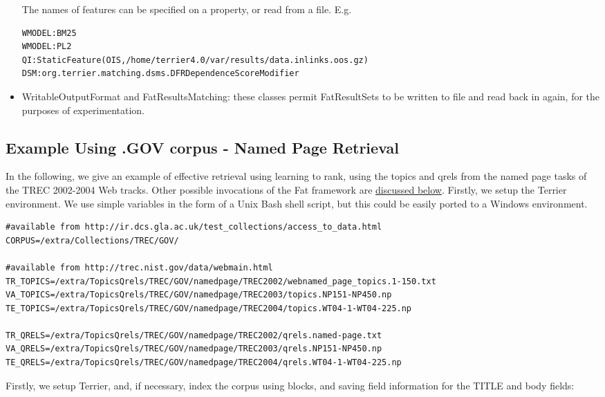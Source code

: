 \begin{itemize}
  The names of features can be specified on a property, or read from a
  file. E.g.

\begin{verbatim}
WMODEL:BM25
WMODEL:PL2
QI:StaticFeature(OIS,/home/terrier4.0/var/results/data.inlinks.oos.gz)
DSM:org.terrier.matching.dsms.DFRDependenceScoreModifier
\end{verbatim}
\item
  WritableOutputFormat and FatResultsMatching: these classes permit
  FatResultSets to be written to file and read back in again, for the
  purposes of experimentation.
\end{itemize}

\subsection{Example Using .GOV corpus - Named Page
Retrieval}\label{example-using-.gov-corpus---named-page-retrieval}

In the following, we give an example of effective retrieval using
learning to rank, using the topics and qrels from the named page tasks
of the TREC 2002-2004 Web tracks. Other possible invocations of the Fat
framework are \protect\hyperlink{other}{discussed below}. Firstly, we
setup the Terrier environment. We use simple variables in the form of a
Unix Bash shell script, but this could be easily ported to a Windows
environment.

\begin{verbatim}
#available from http://ir.dcs.gla.ac.uk/test_collections/access_to_data.html 
CORPUS=/extra/Collections/TREC/GOV/

#available from http://trec.nist.gov/data/webmain.html
TR_TOPICS=/extra/TopicsQrels/TREC/GOV/namedpage/TREC2002/webnamed_page_topics.1-150.txt
VA_TOPICS=/extra/TopicsQrels/TREC/GOV/namedpage/TREC2003/topics.NP151-NP450.np
TE_TOPICS=/extra/TopicsQrels/TREC/GOV/namedpage/TREC2004/topics.WT04-1-WT04-225.np

TR_QRELS=/extra/TopicsQrels/TREC/GOV/namedpage/TREC2002/qrels.named-page.txt
VA_QRELS=/extra/TopicsQrels/TREC/GOV/namedpage/TREC2003/qrels.NP151-NP450.np
TE_QRELS=/extra/TopicsQrels/TREC/GOV/namedpage/TREC2004/qrels.WT04-1-WT04-225.np
\end{verbatim}

Firstly, we setup Terrier, and, if necessary, index the corpus using
blocks, and saving field information for the TITLE and body fields:

